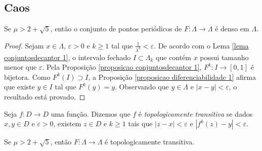 \subsection{Caos}


\begin{proposition}
\label{proposicao caos 1}
Se $\mu > 2 + \sqrt{5}$, então o conjunto de pontos periódicos de $F: \Lambda \to \Lambda$ é denso em $\Lambda$.
\end{proposition}

\begin{proof}
Sejam $x \in \Lambda$, $\varepsilon > 0$ e $k \geq 1$ tal que $\frac{1}{\lambda^k} < \varepsilon$. De acordo com o Lema \ref{lema conjuntosdecantor 1}, o intervalo fechado $I \subset \Lambda_k$ que contém $x$ possui tamanho menor que $\varepsilon$. Pela Proposição \ref{proposicao conjuntosdecantor 1}, $F^k: I \to [0, 1]$ é bijetora. Como $F^k(I) \supset I$, a Proposição \ref{proposicao diferenciabilidade 1} afirma que existe $y \in I$ tal que $F^k(y) = y$. Observando que $y \in \Lambda$ e $|x - y| < \varepsilon$, o resultado está provado.
\end{proof}


\begin{definition}
Seja $f: D \to D$ uma função. Dizemos que $f$ é \textit{topologicamente transitiva} se dados $x, y \in D$ e $\varepsilon > 0$,  existem $z \in D$ e $k \geq 1$ tais que $|z - x| < \varepsilon$ e $|f^k(z) - y| < \varepsilon$.
\end{definition} 


\begin{proposition}
\label{proposicao caos 2}
Se $\mu > 2 + \sqrt{5}$, então $F: \Lambda \to \Lambda$ é topologicamente transitiva.
\end{proposition}

